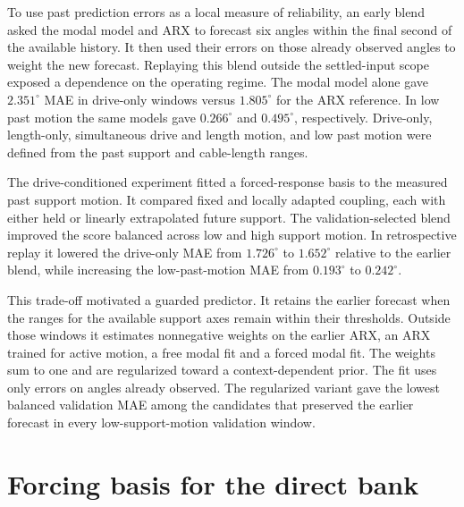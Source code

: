 To use past prediction errors as a local measure of reliability, an early blend asked the modal model and ARX to forecast six angles within the final second of the available history. It then used their errors on those already observed angles to weight the new forecast. Replaying this blend outside the settled-input scope exposed a dependence on the operating regime. The modal model alone gave $2.351^\circ$ MAE in drive-only windows versus $1.805^\circ$ for the ARX reference. In low past motion the same models gave $0.266^\circ$ and $0.495^\circ$, respectively. Drive-only, length-only, simultaneous drive and length motion, and low past motion were defined from the past support and cable-length ranges.

The drive-conditioned experiment fitted a forced-response basis to the measured past support motion. It compared fixed and locally adapted coupling, each with either held or linearly extrapolated future support. The validation-selected blend improved the score balanced across low and high support motion. In retrospective replay it lowered the drive-only MAE from $1.726^\circ$ to $1.652^\circ$ relative to the earlier blend, while increasing the low-past-motion MAE from $0.193^\circ$ to $0.242^\circ$.

This trade-off motivated a guarded predictor. It retains the earlier forecast when the ranges for the available support axes remain within their thresholds. Outside those windows it estimates nonnegative weights on the earlier ARX, an ARX trained for active motion, a free modal fit and a forced modal fit. The weights sum to one and are regularized toward a context-dependent prior. The fit uses only errors on angles already observed. The regularized variant gave the lowest balanced validation MAE among the candidates that preserved the earlier forecast in every low-support-motion validation window.

\section{Forcing basis for the direct bank}
\label{app:forcing}

